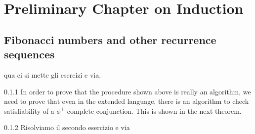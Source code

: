 
\chapter{Preliminary Chapter on Induction}
\label{chp:preliminary}

\section{Fibonacci numbers and other recurrence sequences}

qua ci si mette gli esercizi e via.

\begin{solexe}{0.1.1}
In order to prove that the procedure shown above is really an algorithm, we
need to prove that even in the extended language, there is an algorithm to
check satisfiability of a $\phi^{+}$-complete conjunction. This is shown in
the next theorem.
\end{solexe}

\begin{solexe}{0.1.2}
Risolviamo il secondo esercizio e via
\end{solexe}